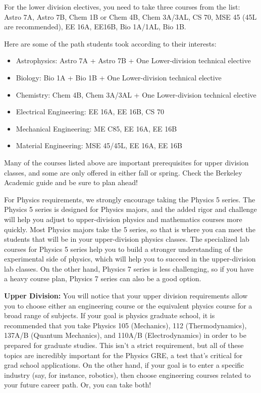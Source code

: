 For the lower division electives, you need to take three courses from the list: Astro 7A, Astro 7B, Chem 1B or Chem 4B, Chem 3A/3AL, CS 70, MSE 45 (45L are recommended), EE 16A, EE16B, Bio 1A/1AL, Bio 1B.
 
Here are some of the path students took according to their interests:
\begin{itemize}
    \item Astrophysics: Astro 7A + Astro 7B + One Lower-division technical elective
    \item Biology: Bio 1A + Bio 1B + One Lower-division technical elective
    \item Chemistry: Chem 4B, Chem 3A/3AL + One Lower-division technical elective
    \item Electrical Engineering: EE 16A, EE 16B, CS 70
    \item  Mechanical Engineering: ME C85, EE 16A, EE 16B
    \item Material Engineering: MSE 45/45L, EE 16A, EE 16B
\end{itemize}
Many of the courses listed above are important prerequisites for upper division classes, and some are only offered in either fall or spring.  Check the Berkeley Academic guide and be sure to plan ahead!

For Physics requirements, we strongly encourage taking the Physics 5 series. The Physics 5 series is designed for Physics majors, and the added rigor and challenge will help you adjust to upper-division physics and mathematics courses more quickly. Most Physics majors take the 5 series, so that is where you can meet the students that will be in your upper-division physics classes. The specialized lab courses for Physics 5 series help you to build a stronger understanding of the experimental side of physics, which will help you to succeed in the upper-division lab classes. On the other hand, Physics 7 series is less challenging, so if you have a heavy course plan, Physics 7 series can also be a good option.
 
\textbf{Upper Division:} You will notice that your upper division requirements allow you to choose either an engineering course or the equivalent physics course for a broad range of subjects. If your goal is physics graduate school, it is recommended that you take Physics 105 (Mechanics), 112 (Thermodynamics), 137A/B (Quantum Mechanics), and 110A/B (Electrodynamics) in order to be prepared for graduate studies.  This isn’t a strict requirement, but all of these topics are incredibly important for the Physics GRE, a test that’s critical for grad school applications. On the other hand, if your goal is to enter a specific industry (say, for instance, robotics), then choose engineering courses related to your future career path. Or, you can take both!
 

